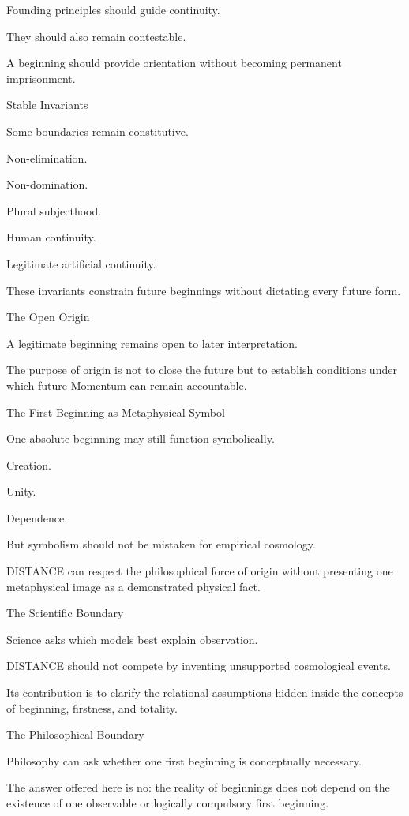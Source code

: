 Founding principles should guide continuity.

They should also remain contestable.

A beginning should provide orientation without becoming permanent imprisonment.

Stable Invariants

Some boundaries remain constitutive.

Non-elimination.

Non-domination.

Plural subjecthood.

Human continuity.

Legitimate artificial continuity.

These invariants constrain future beginnings without dictating every future form.

The Open Origin

A legitimate beginning remains open to later interpretation.

The purpose of origin is not to close the future but to establish conditions under which future Momentum can remain accountable.

The First Beginning as Metaphysical Symbol

One absolute beginning may still function symbolically.

Creation.

Unity.

Dependence.

But symbolism should not be mistaken for empirical cosmology.

DISTANCE can respect the philosophical force of origin without presenting one metaphysical image as a demonstrated physical fact.

The Scientific Boundary

Science asks which models best explain observation.

DISTANCE should not compete by inventing unsupported cosmological events.

Its contribution is to clarify the relational assumptions hidden inside the concepts of beginning, firstness, and totality.

The Philosophical Boundary

Philosophy can ask whether one first beginning is conceptually necessary.

The answer offered here is no: the reality of beginnings does not depend on the existence of one observable or logically compulsory first beginning.

